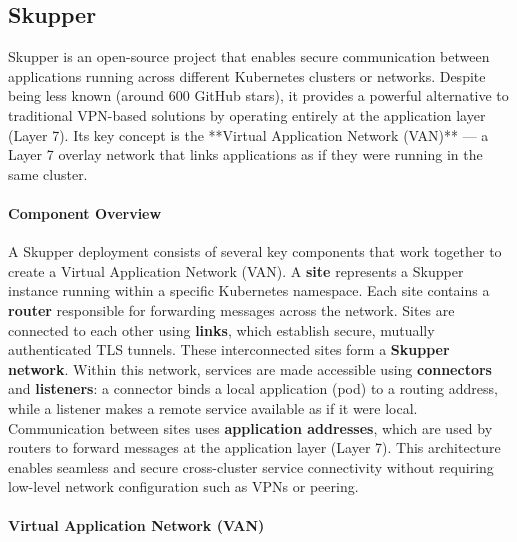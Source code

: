 %
\subsection{Skupper}
%


Skupper is an open-source project that enables secure communication between applications running across different Kubernetes clusters or networks. Despite being less known (around 600 GitHub stars), it provides a powerful alternative to traditional VPN-based solutions by operating entirely at the application layer (Layer 7). Its key concept is the **Virtual Application Network (VAN)** — a Layer 7 overlay network that links applications as if they were running in the same cluster.

\paragraph{Component Overview}%
A Skupper deployment consists of several key components that work together to create a Virtual Application Network (VAN). A \textbf{site} represents a Skupper instance running within a specific Kubernetes namespace. Each site contains a \textbf{router} responsible for forwarding messages across the network. Sites are connected to each other using \textbf{links}, which establish secure, mutually authenticated TLS tunnels. These interconnected sites form a \textbf{Skupper network}. Within this network, services are made accessible using \textbf{connectors} and \textbf{listeners}: a connector binds a local application (pod) to a routing address, while a listener makes a remote service available as if it were local. Communication between sites uses \textbf{application addresses}, which are used by routers to forward messages at the application layer (Layer 7). This architecture enables seamless and secure cross-cluster service connectivity without requiring low-level network configuration such as VPNs or peering.


\paragraph{Virtual Application Network (VAN)}

